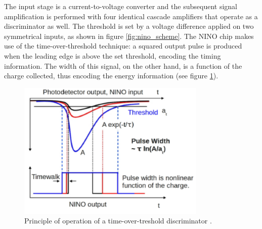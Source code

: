 The input stage is a current-to-voltage converter and the subsequent signal amplification is performed with four identical cascade amplifiers that operate as a discriminator as well.
The threshold is set by a voltage difference applied on two symmetrical inputs, as shown in figure \ref{fig:nino_scheme}.
The NINO chip makes use of the time-over-threshold technique: a squared output pulse is produced when the leading edge is above the set threshold, encoding the timing information. The width of this signal, on the other hand, is a function of the charge collected, thus encoding the energy information (see figure \ref{fig:tot}). 
\begin{figure}[htbp]
\begin{center}
\includegraphics[width=9cm]{../Pictures/Chapter_3/TOT.pdf}
\end{center}
\caption[Time-over-threshold]{Principle of operation of a time-over-treshold discriminator \cite{Gundacker2014}.}
\label{fig:tot}
\end{figure}

